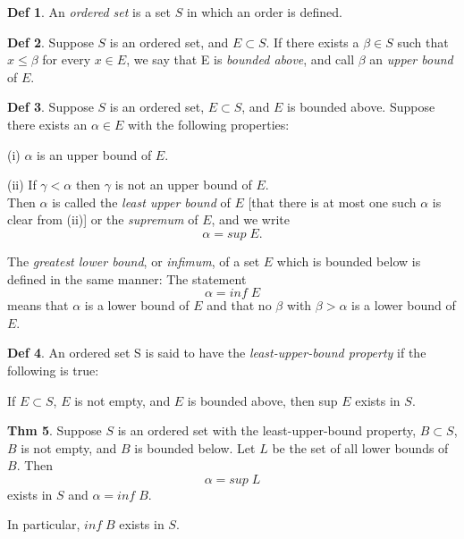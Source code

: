 \documentclass{article}
\theoremstyle{definition}
\newtheorem{definition}{Def}
\newtheorem{theorem}[definition]{Thm}
\begin{document}
\begin{definition}
    An \textit{ordered set} is a set $S$ in which an order is defined.
\end{definition}
\begin{definition}
    Suppose $S$ is an ordered set, and $E \subset S$. If there exists a $\beta \in S$ such that $x \leq \beta$ for every $x \in E$, we say that E is \textit{bounded above}, and call $\beta$ an \textit{upper bound} of $E$.
\end{definition}
\begin{definition}
    Suppose $S$ is an ordered set, $E \subset S$, and $E$ is bounded above. Suppose there exists an $\alpha \in E$ with the following properties:\par
    (i) $\alpha$ is an upper bound of $E$.\par
    (ii) If $\gamma < \alpha$ then $\gamma$ is not an upper bound of $E$.\\
    Then $\alpha$ is called the \textit{least upper bound} of $E$ [that there is at most one such $\alpha$ is clear from (ii)] or the \textit{supremum} of $E$, and we write
    \[
    \alpha = sup\;E.
    \]\par
    The \textit{greatest lower bound}, or \textit{infimum}, of a set $E$ which is bounded below is defined in the same manner: The statement
    \[
    \alpha = inf\;E
    \]
    means that $\alpha$ is a lower bound of $E$ and that no $\beta$ with $\beta > \alpha$ is a lower bound of $E$.
\end{definition}
\begin{definition}
    An ordered set S is said to have the \textit{least-upper-bound property} if the following is true:\par
    If $E \subset S$, $E$ is not empty, and $E$ is bounded above, then sup $E$ exists in $S$.
\end{definition}
\begin{theorem}
    Suppose $S$ is an ordered set with the least-upper-bound property, $B \subset S$, $B$ is not empty, and $B$ is bounded below. Let $L$ be the set of all lower bounds of $B$. Then
    \[
    \alpha = sup\;L
    \]
    exists in $S$ and $\alpha = inf\;B$.\par
    In particular, $inf\;B$ exists in $S$.
\end{theorem}
\end{document}
